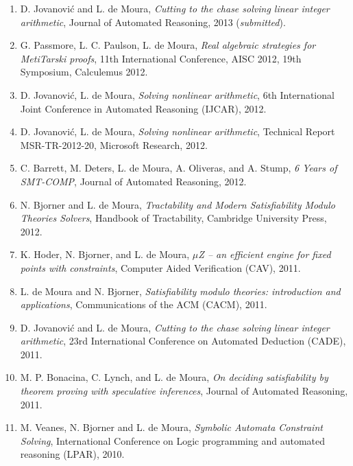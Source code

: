 \documentclass[11pt,a4paper]{article}
\begin{document}
\begin{enumerate}[leftmargin=*,itemsep=0.5ex,topsep=0.6ex]
\item D. Jovanovi\'{c} and L. de Moura,
      {\em Cutting to the chase solving linear integer arithmetic},
      Journal of Automated Reasoning, 2013 ({\em submitted}).

\item G. Passmore, L. C. Paulson, L. de Moura,
      {\em Real algebraic strategies for MetiTarski proofs},
      11th International Conference, AISC 2012, 19th Symposium, Calculemus 2012.

\item D. Jovanovi\'{c}, L. de Moura,
      {\em Solving nonlinear arithmetic},
      6th International Joint Conference in Automated Reasoning (IJCAR), 2012.

\item D. Jovanovi\'{c}, L. de Moura,
      {\em Solving nonlinear arithmetic},
      Technical Report MSR-TR-2012-20, Microsoft Research, 2012.

\item C. Barrett, M. Deters, L. de Moura, A. Oliveras, and A. Stump,
      {\em 6 Years of SMT-COMP},
      Journal of Automated Reasoning, 2012.

\item N. Bjorner and L. de Moura,
      {\em Tractability and Modern Satisfiability Modulo Theories Solvers},
      Handbook of Tractability, Cambridge University Press, 2012.

\item K. Hoder, N. Bjorner, and L. de Moura,
      {\em $\mu$Z -- an efficient engine for fixed points with constraints},
      Computer Aided Verification (CAV), 2011.

\item L. de Moura and N. Bjorner,
      {\em Satisfiability modulo theories: introduction and applications},
      Communications of the ACM (CACM), 2011.

\item D. Jovanovi\'{c} and L. de Moura,
      {\em Cutting to the chase solving linear integer arithmetic},
      23rd International Conference on Automated Deduction (CADE), 2011.

\item M. P. Bonacina, C. Lynch, and L. de Moura,
      {\em On deciding satisfiability by theorem proving with speculative inferences},
      Journal of Automated Reasoning, 2011.

\item M. Veanes, N. Bjorner and L. de Moura,
      {\em Symbolic Automata Constraint Solving},
      International Conference on Logic programming and automated reasoning (LPAR), 2010.


\end{enumerate}
\end{document}
